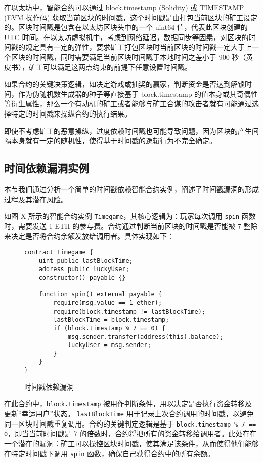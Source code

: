 \documentclass[print, master, vlined, timesmath]{DissertUESTC}
\begin{document}
在以太坊中，智能合约可以通过 block.timestamp (Solidity) 或 TIMESTAMP (EVM 操作码) 获取当前区块的时间戳，这个时间戳是由打包当前区块的矿工设定的。区块时间戳是包含在以太坊区块头中的一个 uint64 值，代表此区块创建的 UTC 时间。在以太坊虚拟机中，考虑到网络延迟，数据同步等因素，对区块的时间戳的规定具有一定的弹性，要求矿工打包区块时当前区块的时间戳一定大于上一个区块的时间戳，同时需要满足当前区块时间戳于本地时间之差小于 900 秒（黄皮书），矿工可以满足这两点约束的前提下任意设置时间戳。

如果合约的关键决策逻辑，如决定游戏或抽奖的赢家，判断资金是否达到解锁时间，作为伪随机数生成器的种子等直接基于 block.timestamp 的值本身或其奇偶性等衍生属性，那么一个有动机的矿工或者能够与矿工合谋的攻击者就有可能通过选择特定的时间戳来操纵合约的执行结果。

即使不考虑矿工的恶意操纵，过度依赖时间戳也可能导致问题，因为区块的产生间隔本身就有一定的随机性，使得基于时间戳的逻辑行为不完全确定。

\subsection{时间依赖漏洞实例}
本节我们通过分析一个简单的时间戳依赖智能合约实例，阐述了时间戳漏洞的形成过程及其潜在风险。

如图 X 所示的智能合约实例 \texttt{Timegame}，其核心逻辑为：玩家每次调用 \texttt{spin} 函数时，需要发送 1 ETH 的参与费。合约通过判断当前区块的时间戳是否能被 7 整除来决定是否将合约余额发放给调用者。具体实现如下：

\begin{figure}[H]
    \centering
    \begin{minipage}{0.9\textwidth}
    \begin{verbatim}
contract Timegame {
    uint public lastBlockTime;
    address public luckyUser;
    constructor() payable {}

    function spin() external payable {
        require(msg.value == 1 ether);
        require(block.timestamp != lastBlockTime);
        lastBlockTime = block.timestamp;
        if (block.timestamp % 7 == 0) {
            msg.sender.transfer(address(this).balance);
            luckyUser = msg.sender;
        }
    }
}
    \end{verbatim}
    \end{minipage}
    \caption{时间戳依赖漏洞}
\end{figure}

在此合约中，\texttt{block.timestamp} 被用作判断条件，用以决定是否执行资金转移及更新“幸运用户”状态。 \texttt{lastBlockTime} 用于记录上次合约调用的时间戳，以避免同一区块时间戳重复调用。合约的关键判定逻辑是基于 \texttt{block.timestamp \% 7 == 0}，即当当前时间戳是 7 的倍数时，合约将把所有的资金转移给调用者。此处存在一个潜在的漏洞：矿工可以操控区块时间戳，使其满足该条件，从而使得他们能够在特定时间戳下调用 \texttt{spin} 函数，确保自己获得合约中的所有余额。
\end{document}
